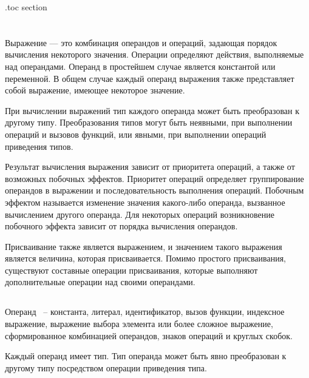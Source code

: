 \renewcommand{\lstlistingname}{Пример}

\etocsettocdepth.toc {section}

\chapter{}
\label{sec:Expressions}

Выражение — это комбинация операндов и операций, задающая порядок вычисления некоторого значения. Операции определяют действия, выполняемые над операндами. Операнд в простейшем случае является константой или переменной. В общем случае каждый операнд выражения также представляет собой выражение, имеющее некоторое значение. \killoverfullbefore

При вычислении выражений тип каждого операнда может быть преобразован к другому типу. Преобразования типов могут быть неявными, при выполнении операций и вызовов функций, или явными, при выполнении операций приведения типов. \killoverfullbefore

Результат вычисления выражения зависит от приоритета операций, а также от возможных побочных эффектов. Приоритет операций определяет группирование операндов в выражении и последовательность выполнения операций. Побочным эффектом называется изменение значения какого-либо операнда, вызванное вычислением другого операнда. Для некоторых операций возникновение побочного эффекта зависит от порядка вычисления операндов. \killoverfullbefore

Присваивание также является выражением, и значением такого выражения является величина, которая присваивается. Помимо простого присваивания, существуют составные операции присваивания, которые выполняют дополнительные операции над своими операндами. \killoverfullbefore
\section{}

Операнд ~-- константа, литерал, идентификатор, вызов функции, индексное выражение, выражение выбора элемента или более сложное выражение, сформированное комбинацией операндов, знаков операций и круглых скобок.  \killoverfullbefore

Каждый операнд имеет тип. Тип операнда может быть явно преобразован к другому типу посредством операции приведения типа.  \killoverfullbefore 

